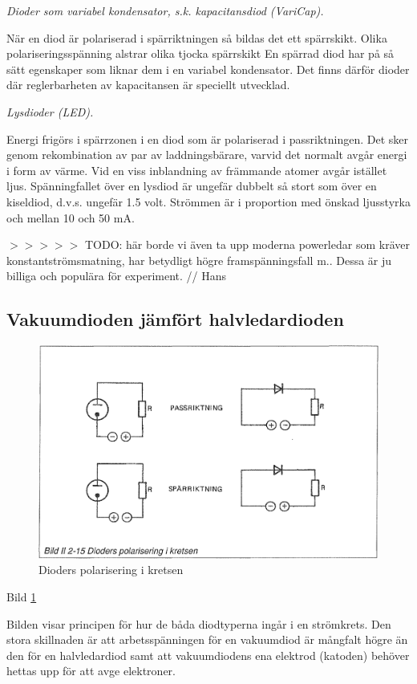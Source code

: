 \label{varicap}
\emph{Dioder som variabel kondensator, s.k. kapacitansdiod (VariCap).}

  När en diod är polariserad i spärriktningen så bildas det ett spärrskikt.
  Olika polariseringsspänning alstrar olika tjocka spärrskikt En spärrad diod
  har på så sätt egenskaper som liknar dem i en variabel kondensator. Det finns
  därför dioder där reglerbarheten av kapacitansen är speciellt utvecklad.

\emph{Lysdioder (LED).}

  Energi frigörs i spärrzonen i en diod som är polariserad i passriktningen. Det
  sker genom rekombination av par av laddningsbärare, varvid det normalt avgår
  energi i form av värme. Vid en viss inblandning av främmande atomer avgår
  istället ljus. Spänningfallet över en lysdiod är ungefär dubbelt så stort som
  över en kiseldiod, d.v.s. ungefär 1.5 volt. Strömmen är i proportion med
  önskad ljusstyrka och mellan 10 och 50 mA.

  $>>>>>$ TODO: här borde vi även ta upp moderna powerledar som kräver
  konstantströmsmatning, har betydligt högre framspänningsfall m..
  Dessa är ju billiga och populära för experiment. // Hans

\subsection{Vakuumdioden jämfört halvledardioden}

\begin{figure}[h]
\begin{center}
\includegraphics[width=14cm]{images/bild_2_2-15}
\caption{Dioders polarisering i kretsen}
\label{fig:BildII2-15}
\end{center}
\end{figure}

Bild \ref{fig:BildII2-15}

Bilden visar principen för hur de båda diodtyperna ingår i en strömkrets. Den
stora skillnaden är att arbetsspänningen för en vakuumdiod är mångfalt högre än
den för en halvledardiod samt att vakuumdiodens ena elektrod (katoden) behöver
hettas upp för att avge elektroner.
